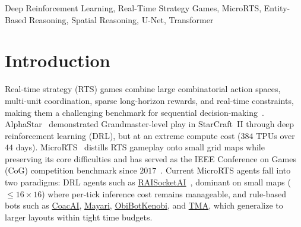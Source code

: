 \documentclass[conference]{IEEEtran}
\newcommand{\code}[1]{{\ttfamily\hyphenchar\font=45\relax #1}}
\newcommand{\urlref}[2]{\href{#1}{\textcolor{link-bot}{#2}}}
\begin{document}
\begin{abstract}
In MicroRTS, the canonical real-time strategy benchmark, competitive play requires coordinating many units on the same grid. Yet, current deep reinforcement learning agents reason only over spatial feature maps and treat units implicitly through stacks of channels. The contributions of this paper are threefold: \textbf{\emph{(i)}} \code{UECD}, a hybrid architecture coupling spatial and per-unit reasoning explicitly via a multi-scale convolutional backbone and a Transformer over unit entities; \textbf{\emph{(ii)}} a PPO training recipe distilled from systematic ablation; \textbf{\emph{(iii)}} a reproducible round-robin tournament. On \emph{basesWorkers16x16A}, \code{UECD} reaches a $96.67$\% win-rate, ahead of all prior competition winners.
\end{abstract}

\begin{IEEEkeywords}
Deep Reinforcement Learning, Real-Time Strategy Games, MicroRTS, Entity-Based Reasoning, Spatial Reasoning, U-Net, Transformer
\end{IEEEkeywords}

\section{Introduction}

Real-time strategy (RTS) games combine large combinatorial action spaces, multi-unit coordination, sparse long-horizon rewards, and real-time constraints, making them a challenging benchmark for sequential decision-making~\cite{buroRTSChallenge2003, ontanonSurveyRealTimeStrategy2013}. AlphaStar~\cite{vinyalsGrandmasterLevelStarCraft2019} demonstrated Grandmaster-level play in StarCraft~II through deep reinforcement learning (DRL), but at an extreme compute cost ($384$ TPUs over $44$ days). MicroRTS~\cite{ontanonCombinatorialMultiArmedBandit2013} distills RTS gameplay onto small grid maps while preserving its core difficulties and has served as the IEEE Conference on Games (CoG) competition benchmark since $2017$~\cite{ontanonFirstMicroRTSArtificial2018}. Current MicroRTS agents fall into two paradigms: DRL agents such as \urlref{https://github.com/sgoodfriend/rl-algo-impls}{RAISocketAI}~\cite{goodfriendCompetitionWinningDeep2024}, dominant on small maps ($\le\!16{\times}16$) where per-tick inference cost remains manageable, and rule-based bots such as \urlref{https://github.com/Coac/coac-ai-microrts}{CoacAI}, \urlref{https://github.com/barvazkrav/mayariBot}{Mayari}, \urlref{https://github.com/Jannis42/MicroRTSObiBotKenobi}{ObiBotKenobi}, and \urlref{https://github.com/MazzaAlessandro/TMA}{TMA}, which generalize to larger layouts within tight time budgets.
\end{document}
